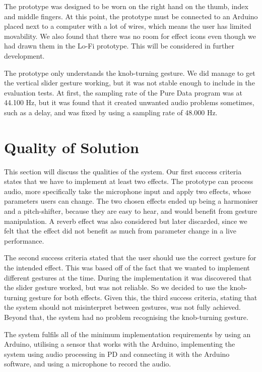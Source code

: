 The prototype was designed to be worn on the right hand on the thumb, index and middle fingers. At this point, the prototype must be connected to an Arduino placed next to a computer with a lot of wires, which means the user has limited movability. We also found that there was no room for effect icons even though we had drawn them in the Lo-Fi prototype. This will be considered in further development.

The prototype only understands the knob-turning gesture. We did manage to get the vertical slider gesture working, but it was not stable enough to include in the evaluation tests. At first, the sampling rate of the Pure Data program was at 44.100 Hz, but it was found that it created unwanted audio problems sometimes, such as a delay, and was fixed by using a sampling rate of 48.000 Hz.

\section{Quality of Solution}

This section will discuss the qualities of the system. Our first success criteria states that we have to implement at least two effects. The prototype can process audio, more specifically take the microphone input and apply two effects, whose parameters users can change. The two chosen effects ended up being a harmoniser and a pitch-shifter, because they are easy to hear, and would benefit from gesture manipulation. A reverb effect was also considered but later discarded, since we felt that the effect did not benefit as much from parameter change in a live performance.

The second success criteria stated that the user should use the correct gesture for the intended effect. This was based off of the fact that we wanted to implement different gestures at the time. During the implementation it was discovered that the slider gesture worked, but was not reliable. So we decided to use the knob-turning gesture for both effects. Given this, the third success criteria, stating that the system should not misinterpret between gestures, was not fully achieved. Beyond that, the system had no problem recognising the knob-turning gesture.

The system fulfils all of the minimum implementation requirements by using an Arduino, utilising a sensor that works with the Arduino, implementing the system using audio processing in PD and connecting it with the Arduino software, and using a microphone to record the audio.

